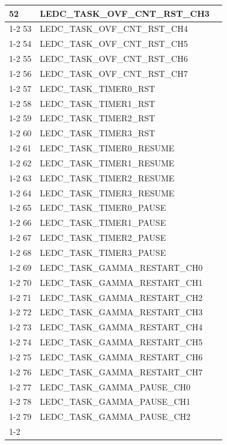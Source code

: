 \documentclass[main\_\_CN.tex]{subfiles}
\begin{document}
\begin{longtable}{ | l | l | l | }
52  & LEDC\_TASK\_OVF\_CNT\_RST\_CH3& \\ \cline{1-2}
53  & LEDC\_TASK\_OVF\_CNT\_RST\_CH4& \\ \cline{1-2}
54  & LEDC\_TASK\_OVF\_CNT\_RST\_CH5& \\ \cline{1-2}
55  & LEDC\_TASK\_OVF\_CNT\_RST\_CH6& \\ \cline{1-2}
56  & LEDC\_TASK\_OVF\_CNT\_RST\_CH7& \\ \cline{1-2}
57  & LEDC\_TASK\_TIMER0\_RST  & \\ \cline{1-2}
58  & LEDC\_TASK\_TIMER1\_RST  & \\ \cline{1-2}
59  & LEDC\_TASK\_TIMER2\_RST  & \\ \cline{1-2}
60  & LEDC\_TASK\_TIMER3\_RST  & \\ \cline{1-2}
61  & LEDC\_TASK\_TIMER0\_RESUME    & \\ \cline{1-2}
62  & LEDC\_TASK\_TIMER1\_RESUME    & \\ \cline{1-2}
63  & LEDC\_TASK\_TIMER2\_RESUME    & \\ \cline{1-2}
64  & LEDC\_TASK\_TIMER3\_RESUME    & \\ \cline{1-2}
65  & LEDC\_TASK\_TIMER0\_PAUSE& \\ \cline{1-2}
66  & LEDC\_TASK\_TIMER1\_PAUSE& \\ \cline{1-2}
67  & LEDC\_TASK\_TIMER2\_PAUSE& \\ \cline{1-2}
68  & LEDC\_TASK\_TIMER3\_PAUSE& \\ \cline{1-2}
69  & LEDC\_TASK\_GAMMA\_RESTART\_CH0      & \\ \cline{1-2}
70  & LEDC\_TASK\_GAMMA\_RESTART\_CH1      & \\ \cline{1-2}
71  & LEDC\_TASK\_GAMMA\_RESTART\_CH2      & \\ \cline{1-2}
72  & LEDC\_TASK\_GAMMA\_RESTART\_CH3      & \\ \cline{1-2}
73  & LEDC\_TASK\_GAMMA\_RESTART\_CH4      & \\ \cline{1-2}
74  & LEDC\_TASK\_GAMMA\_RESTART\_CH5      & \\ \cline{1-2}
75  & LEDC\_TASK\_GAMMA\_RESTART\_CH6      & \\ \cline{1-2}
76  & LEDC\_TASK\_GAMMA\_RESTART\_CH7      & \\ \cline{1-2}
77  & LEDC\_TASK\_GAMMA\_PAUSE\_CH0 & \\ \cline{1-2}
78  & LEDC\_TASK\_GAMMA\_PAUSE\_CH1 & \\ \cline{1-2}
79  & LEDC\_TASK\_GAMMA\_PAUSE\_CH2 & \\ \cline{1-2}

\end{longtable}
\end{document}
